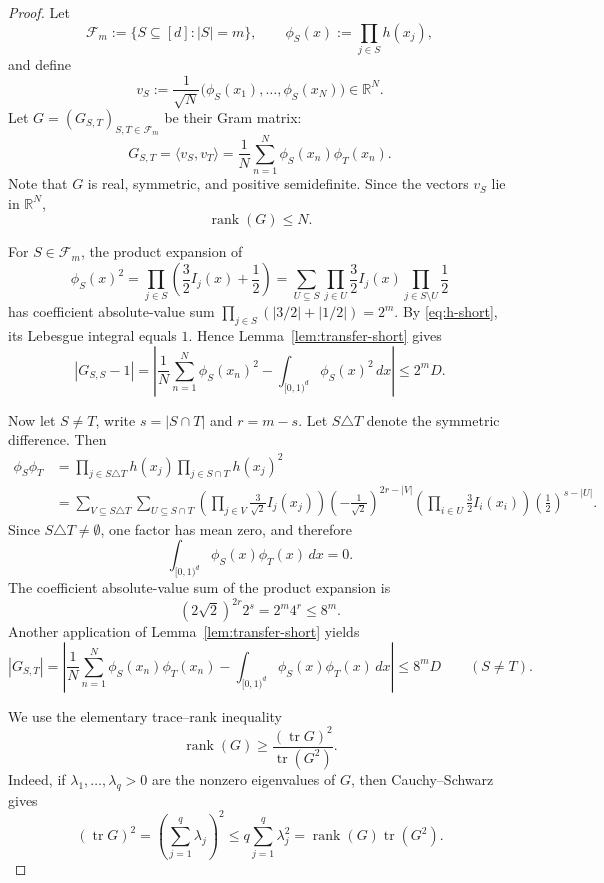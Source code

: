 \documentclass[11pt]{article}
\theoremstyle{plain}
\theoremstyle{remark}
\theoremstyle{definition}
\newcommand{\1}{\mathbf{1}}
\newcommand{\R}{\mathbb{R}}
\newcommand{\tr}{\operatorname{tr}}
\newcommand{\rank}{\operatorname{rank}}
\begin{document}
\begin{proof}
Let
\[
 \mathcal F_m:=\{S\subseteq[d]:|S|=m\},
 \qquad
 \phi_S(x):=\prod_{j\in S}h(x_j),
\]
and define
\[
 v_S:=\frac1{\sqrt N}
 \bigl(\phi_S(x_1),\dots,\phi_S(x_N)\bigr)\in\R^N.
\]
Let \(G=(G_{S,T})_{S,T\in\mathcal F_m}\) be their Gram matrix:
\[
 G_{S,T}
 =
 \langle v_S,v_T\rangle
 =
 \frac1N\sum_{n=1}^N\phi_S(x_n)\phi_T(x_n).
\] 
Note that $G$ is real, symmetric, and positive semidefinite.
Since the vectors \(v_S\) lie in \(\R^N\),
\begin{equation}\label{eq:rank-upper-short}
 \rank(G)\le N.
\end{equation}

For \(S\in\mathcal F_m\), the product expansion of
\[
 \phi_S(x)^2
 =
 \prod_{j\in S}
 \left(\frac32I_j(x)+\frac12\right) = \sum_{U \subseteq S} \prod_{j \in U} \frac32 I_j(x) \prod_{j \in S \setminus U} \frac12
\]
has coefficient absolute-value sum \(\prod_{j \in S} (|3/2| + |1/2|) = 2^m\).  By
\eqref{eq:h-short}, its Lebesgue integral equals \(1\).  Hence
Lemma~\ref{lem:transfer-short} gives
\begin{equation}\label{eq:diag-short}
 |G_{S,S}-1| = \left|\frac{1}{N} \sum_{n=1}^N \phi_S(x_n)^2 - \int_{[0,1)^d} \phi_S(x)^2 \,d x \right| \le 2^m D.
\end{equation}

Now let \(S\ne T\), write \(s=|S\cap T|\) and \(r=m-s\). Let $S \triangle T$ denote the symmetric difference. Then
\begin{align*}
 \phi_S\phi_T
 & =
 \prod_{j\in S\triangle T}h(x_j)
 \prod_{j\in S\cap T}h(x_j)^2  \\ & = \sum_{V \subseteq S \triangle T} \sum_{U \subseteq S \cap T} \left(\prod_{j \in V} \frac{3}{\sqrt{2}} I_j(x_j) \right) \left( -\frac{1}{\sqrt{2}} \right)^{2r - |V|} \left( \prod_{i \in U} \frac32 I_i(x_i) \right) \left( \frac12 \right)^{s - |U|}.
\end{align*}
Since \(S\triangle T\ne \emptyset \), one factor has mean zero, and
therefore
\[
 \int_{[0,1)^d}\phi_S(x)\phi_T(x)\,dx=0.
\]
The coefficient absolute-value sum of the product expansion is
\[
 (2\sqrt2)^{2r}2^s
 =2^m4^r
 \le8^m.
\]
Another application of Lemma~\ref{lem:transfer-short} yields
\begin{equation}\label{eq:offdiag-short}
 |G_{S,T}| = \left| \frac{1}{N} \sum_{n=1}^N \phi_S(x_n) \phi_T(x_n) - \int_{[0,1)^d} \phi_S(x) \phi_T(x) \,d x \right|  \le 8^m D
 \qquad(S\ne T).
\end{equation}

We use the elementary trace--rank inequality
\begin{equation}\label{eq:trace-rank-short}
 \rank(G)\ge\frac{(\tr G)^2}{\tr(G^2)}.
\end{equation}
Indeed, if \(\lambda_1,\dots,\lambda_q>0\) are the nonzero eigenvalues
of \(G\), then Cauchy--Schwarz gives
\[
 (\tr G)^2
 =
 \left(\sum_{j=1}^q\lambda_j\right)^2
 \le q\sum_{j=1}^q\lambda_j^2
 =
 \rank(G)\tr(G^2).
\]


\end{proof}
\end{document}
